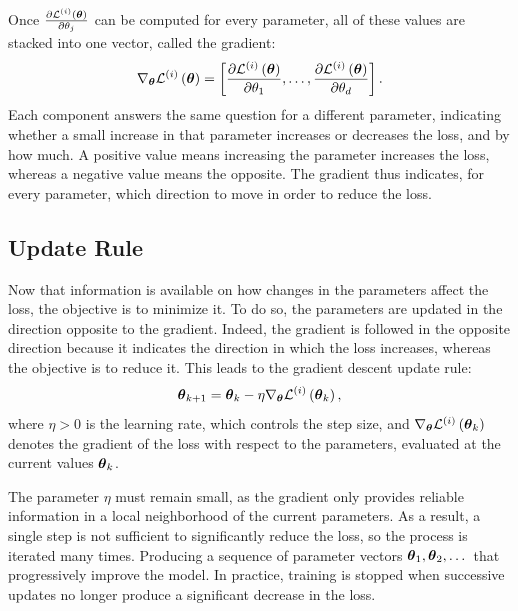 Once $\frac{\partial \loss{\params}{i}}{\partial \theta_j}$ can be computed for every parameter, all of these values are stacked into one vector, called the gradient:
\begin{equation}
\nabla_{\params} \loss{\params}{i} =
\left[
\frac{\partial \loss{\params}{i}}{\partial \theta_1},
\dots,
\frac{\partial \loss{\params}{i}}{\partial \theta_d}
\right].
\label{eq:gradient}
\end{equation}
Each component answers the same question for a different parameter, indicating whether a small increase in that parameter increases or decreases the loss, and by how much.
A positive value means increasing the parameter increases the loss, whereas a negative value means the opposite.
The gradient thus indicates, for every parameter, which direction to move in order to reduce the loss.

\subsection{Update Rule}

Now that information is available on how changes in the parameters affect the loss, the objective is to minimize it.
To do so, the parameters are updated in the direction opposite to the gradient.
Indeed, the gradient is followed in the opposite direction because it indicates the direction in which the loss increases, whereas the objective is to reduce it.
This leads to the gradient descent update rule:
\begin{equation}
\params_{k+1} = \params_{k} - \eta \nabla_{\params} \loss{\params_{k}}{i},
\label{eq:gradient_descent_update}
\end{equation}
where $\eta > 0$ is the learning rate, which controls the step size, and $\nabla_{\params} \loss{\params_{k}}{i}$ denotes the gradient of the loss with respect to the parameters, evaluated at the current values $\params_{k}$.

The parameter $\eta$ must remain small, as the gradient only provides reliable information in a local neighborhood of the current parameters.
As a result, a single step is not sufficient to significantly reduce the loss, so the process is iterated many times.
Producing a sequence of parameter vectors $\params_{1}, \params_{2}, \dots$ that progressively improve the model.
In practice, training is stopped when successive updates no longer produce a significant decrease in the loss.

